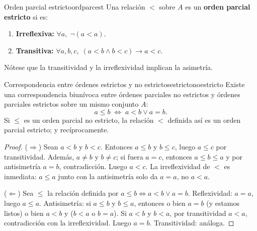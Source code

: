 \begin{definicion}{Orden parcial estricto}{ordparcest}
Una relación $<$ sobre $A$ es un \textbf{orden parcial estricto} si es:
\begin{enumerate}[leftmargin=2em, label=(\roman*)]
  \item \textbf{Irreflexiva:} $\forall a,\; \neg(a < a)$.
  \item \textbf{Transitiva:} $\forall a,b,c,\; (a < b \wedge b < c) \to a < c$.
\end{enumerate}
Nótese que la transitividad y la irreflexividad implican la asimetría.
\end{definicion}

\begin{proposicion}{Correspondencia entre órdenes estrictos y no estrictos}{estrictonoestricto}
Existe una correspondencia biunívoca entre órdenes parciales no estrictos y órdenes parciales estrictos sobre un mismo conjunto $A$:
\[
  a \leq b \;\iff\; a < b \vee a = b.
\]
Si $\leq$ es un orden parcial no estricto, la relación $<$ definida así es un orden parcial estricto; y recíprocamente.
\end{proposicion}

\begin{proof}
($\Rightarrow$) Sean $a < b$ y $b < c$. Entonces $a \leq b$ y $b \leq c$, luego $a \leq c$ por transitividad. Además, $a \neq b$ y $b \neq c$; si fuera $a = c$, entonces $a \leq b \leq a$ y por antisimetría $a = b$, contradicción. Luego $a < c$. La irreflexividad de $<$ es inmediata: $a \leq a$ junto con la antisimetría solo da $a = a$, no $a < a$.

($\Leftarrow$) Sea $\leq$ la relación definida por $a \leq b \iff a < b \vee a = b$. Reflexividad: $a = a$, luego $a \leq a$. Antisimetría: si $a \leq b$ y $b \leq a$, entonces o bien $a = b$ (y estamos listos) o bien $a < b$ y ($b < a$ o $b = a$). Si $a < b$ y $b < a$, por transitividad $a < a$, contradicción con la irreflexividad. Luego $a = b$. Transitividad: análoga.
\end{proof}

